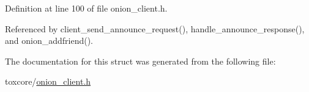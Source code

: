 Definition at line 100 of file onion\+\_\+client.\+h.



Referenced by client\+\_\+send\+\_\+announce\+\_\+request(), handle\+\_\+announce\+\_\+response(), and onion\+\_\+addfriend().



The documentation for this struct was generated from the following file\+:\begin{DoxyCompactItemize}
\item 
toxcore/\hyperlink{onion__client_8h}{onion\+\_\+client.\+h}\end{DoxyCompactItemize}
